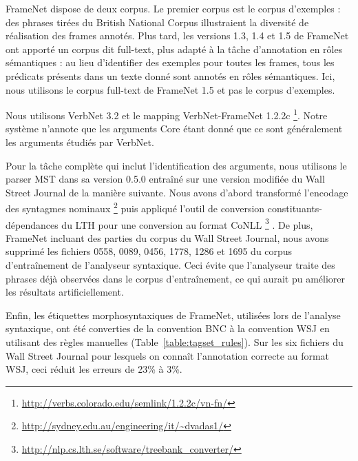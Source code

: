 FrameNet dispose de deux corpus. Le premier corpus est le corpus d'exemples :
des phrases tirées du British National Corpus illustraient la diversité de
réalisation des frames annotés. Plus tard, les versions 1.3, 1.4 et 1.5 de
FrameNet ont apporté un corpus dit full-text, plus adapté à la tâche
d'annotation en rôles sémantiques : au lieu d'identifier des exemples pour
toutes les frames, tous les prédicats présents dans un texte donné sont annotés
en rôles sémantiques. Ici, nous utilisons le corpus full-text de FrameNet 1.5
et pas le corpus d'exemples.

Nous utilisons VerbNet 3.2 et le mapping VerbNet-FrameNet 1.2.2c
\footnote{\url{http://verbs.colorado.edu/semlink/1.2.2c/vn-fn/}}. Notre système
n'annote que les arguments Core étant donné que ce sont généralement les
arguments étudiés par VerbNet.

Pour la tâche complète qui inclut l'identification des arguments, nous
utilisons le parser MST dans sa version 0.5.0 \citep{mcdonald2006multilingual}
entraîné sur une version modifiée du Wall Street Journal de la manière
suivante. Nous avons d'abord transformé l'encodage des syntagmes nominaux
\footnote{\url{http://sydney.edu.au/engineering/it/~dvadas1/}}
\citep{vadas2007adding} puis appliqué l'outil de conversion
constituants-dépendances du LTH pour une conversion au format CoNLL
\footnote{\url{http://nlp.cs.lth.se/software/treebank_converter/}}
\citep{johansson2007extended}. De plus, FrameNet incluant des parties du corpus
du Wall Street Journal, nous avons supprimé les fichiers 0558, 0089, 0456,
1778, 1286 et 1695 du corpus d'entraînement de l'analyseur syntaxique. Ceci
évite que l'analyseur traite des phrases déjà observées dans le corpus
d'entraînement, ce qui aurait pu améliorer les résultats artificiellement.

Enfin, les étiquettes morphosyntaxiques de FrameNet, utilisées lors de
l'analyse syntaxique, ont été converties de la convention BNC à la convention
WSJ en utilisant des règles manuelles (Table~\ref{table:tagset_rules}). Sur les
six fichiers du Wall Street Journal pour lesquels on connaît l'annotation
correcte au format WSJ, ceci réduit les erreurs de 23\% à 3\%.

